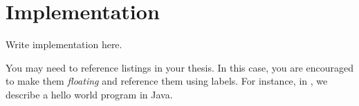 \chapter{Implementation} %
\label{chap:implementation}


Write implementation here.



You may need to reference listings in your thesis.
%
In this case, you are encouraged to make them \emph{floating} and reference them using labels.
%
For instance, in , we describe a hello world program in Java.